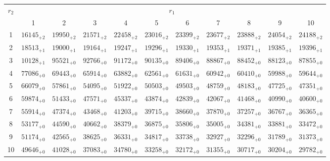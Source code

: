 \documentclass[10pt, a4paper]{article}
\begin{document}
\begin{center}
    \begin{tabular}{c || c c c c c | c c c c c}
        \multirow{2}{*}{\(r_2\)} & \multicolumn{10}{c}{\(r_1\)} \\
        & 1 & 2 & 3 & 4 & 5 & 6 & 7 & 8 & 9 & 10\\
        \hline\hline
        1 & \({16145}_{+2}\) & \({19950}_{+2}\) & \({21571}_{+2}\) & \({22458}_{+2}\) & \({23016}_{+2}\) & \({23399}_{+2}\) & \({23677}_{+2}\) & \({23888}_{+2}\) & \({24054}_{+2}\) & \({24188}_{+2}\)\\
        2 & \({18513}_{+1}\) & \({19000}_{+1}\) & \({19164}_{+1}\) & \({19247}_{+1}\) & \({19296}_{+1}\) & \({19330}_{+1}\) & \({19353}_{+1}\) & \({19371}_{+1}\) & \({19385}_{+1}\) & \({19396}_{+1}\)\\
        3 & \({10128}_{+1}\) & \({95521}_{+0}\) & \({92766}_{+0}\) & \({91172}_{+0}\) & \({90135}_{+0}\) & \({89406}_{+0}\) & \({88867}_{+0}\) & \({88452}_{+0}\) & \({88123}_{+0}\) & \({87855}_{+0}\)\\
        4 & \({77086}_{+0}\) & \({69443}_{+0}\) & \({65914}_{+0}\) & \({63882}_{+0}\) & \({62561}_{+0}\) & \({61631}_{+0}\) & \({60942}_{+0}\) & \({60410}_{+0}\) & \({59988}_{+0}\) & \({59644}_{+0}\)\\
        5 & \({66079}_{+0}\) & \({57861}_{+0}\) & \({54095}_{+0}\) & \({51922}_{+0}\) & \({50503}_{+0}\) & \({49503}_{+0}\) & \({48759}_{+0}\) & \({48183}_{+0}\) & \({47725}_{+0}\) & \({47351}_{+0}\)\\
        \hline
        6 & \({59874}_{+0}\) & \({51433}_{+0}\) & \({47571}_{+0}\) & \({45337}_{+0}\) & \({43874}_{+0}\) & \({42839}_{+0}\) & \({42067}_{+0}\) & \({41468}_{+0}\) & \({40990}_{+0}\) & \({40600}_{+0}\)\\
        7 & \({55914}_{+0}\) & \({47374}_{+0}\) & \({43468}_{+0}\) & \({41203}_{+0}\) & \({39715}_{+0}\) & \({38660}_{+0}\) & \({37870}_{+0}\) & \({37257}_{+0}\) & \({36767}_{+0}\) & \({36365}_{+0}\)\\
        8 & \({53177}_{+0}\) & \({44590}_{+0}\) & \({40662}_{+0}\) & \({38379}_{+0}\) & \({36875}_{+0}\) & \({35806}_{+0}\) & \({35005}_{+0}\) & \({34381}_{+0}\) & \({33881}_{+0}\) & \({33472}_{+0}\)\\
        9 & \({51174}_{+0}\) & \({42565}_{+0}\) & \({38625}_{+0}\) & \({36331}_{+0}\) & \({34817}_{+0}\) & \({33738}_{+0}\) & \({32927}_{+0}\) & \({32296}_{+0}\) & \({31789}_{+0}\) & \({31373}_{+0}\)\\
        10 & \({49646}_{+0}\) & \({41028}_{+0}\) & \({37083}_{+0}\) & \({34780}_{+0}\) & \({33258}_{+0}\) & \({32172}_{+0}\) & \({31355}_{+0}\) & \({30717}_{+0}\) & \({30204}_{+0}\) & \({29782}_{+0}\)\\

\end{tabular}
\end{center}
\end{document}
